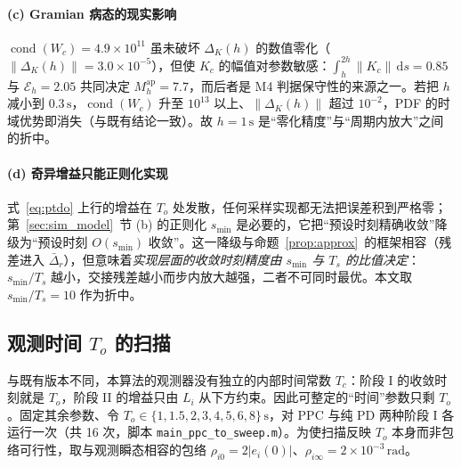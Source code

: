\paragraph{(c) Gramian 病态的现实影响}
\(\operatorname{cond}(W_c)=4.9\times10^{11}\) 虽未破坏 \(\Delta_K(h)\) 的数值零化（\(\lVert\Delta_K(h)\rVert=3.0\times10^{-5}\)），但使 \(K_c\) 的幅值对参数敏感：\(\int_h^{2h}\lVert K_c\rVert\,\mathrm ds=0.85\) 与 \(\mathcal E_h=2.05\) 共同决定 \(M_h^{\mathrm{ap}}=7.7\)，而后者是 M4 判据保守性的来源之一。若把 \(h\) 减小到 \(0.3\,\mathrm s\)，\(\operatorname{cond}(W_c)\) 升至 \(10^{13}\) 以上、\(\lVert\Delta_K(h)\rVert\) 超过 \(10^{-2}\)，PDF 的时域优势即消失（与既有结论一致）。故 \(h=1\,\mathrm s\) 是“零化精度”与“周期内放大”之间的折中。

\paragraph{(d) 奇异增益只能正则化实现}
式~\eqref{eq:ptdo} 上行的增益在 \(T_o\) 处发散，任何采样实现都无法把误差积到严格零；第~\ref{sec:sim_model}~节 (b) 的正则化 \(s_{\min}\) 是必要的，它把“预设时刻精确收敛”降级为“预设时刻 \(O(s_{\min})\) 收敛”。这一降级与命题~\ref{prop:approx}~的框架相容（残差进入 \(\bar\Delta_r\)），但意味着\emph{实现层面的收敛时刻精度由 \(s_{\min}\) 与 \(T_s\) 的比值决定}：\(s_{\min}/T_s\) 越小，交接残差越小而步内放大越强，二者不可同时最优。本文取 \(s_{\min}/T_s=10\) 作为折中。

\subsection{观测时间 \(T_o\) 的扫描}
\label{sec:sim_sweep}

与既有版本不同，本算法的观测器没有独立的内部时间常数 \(T_c\)：阶段 I 的收敛时刻就是 \(T_o\)，阶段 II 的增益只由 \(L_i\) 从下方约束。因此可整定的“时间”参数只剩 \(T_o\)。固定其余参数、令 \(T_o\in\{1,1.5,2,3,4,5,6,8\}\,\mathrm{s}\)，对 PPC 与纯 PD 两种阶段 I 各运行一次（共 16 次，脚本 \texttt{main\_ppc\_to\_sweep.m}）。为使扫描反映 \(T_o\) 本身而非包络可行性，取与观测瞬态相容的包络 \(\rho_{i0}=2\lvert e_i(0)\rvert\)、\(\rho_{i\infty}=2\times10^{-3}\,\mathrm{rad}\)。

